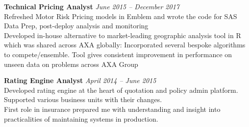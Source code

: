 \documentclass[11pt]{article}
\begin{document}
\begin{description}
\textbf{Technical Pricing Analyst} \emph{June 2015 -- December 2017}\\
\textbullet \quad Refreshed Motor Risk Pricing models in Emblem and wrote the code for SAS Data Prep, post-deploy analysis and monitoring \\
\textbullet \quad Developed in-house alternative to market-leading geographic analysis tool in R which was shared across AXA globally: Incorporated several bespoke algorithms to compete/ensemble. Tool gives consistent improvement in performance on unseen data on problems across AXA Group

\textbf{Rating Engine Analyst} \emph{April 2014 -- June 2015}\\
\textbullet \quad Developed rating engine at the heart of quotation and policy admin platform. Supported various business units with their changes. \\
\textbullet \quad First role in insurance prepared me with understanding and insight into practicalities of maintaining systems in production.
\end{description}
\end{document}
